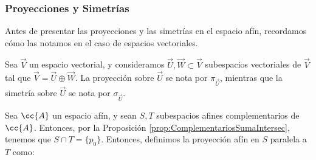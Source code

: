 \subsubsection{Proyecciones y Simetrías}
\begin{notacion}
    Antes de presentar las proyecciones y las simetrías en el espacio afín, recordamos cómo las notamos en el caso de espacios vectoriales.
    
    Sea $\vec{V}$ un espacio vectorial, y consideramos $\vec{U},\vec{W}\subset\vec{V}$ subespacios vectoriales de $\vec{V}$ tal que $\vec{V}=\vec{U}\oplus \vec{W}$. La proyección sobre $\vec{U}$ se nota por $\pi_{\vec{U}}$, mientras que la simetría sobre $\vec{U}$ se nota por $\sigma_{\vec{U}}$.
\end{notacion}
\begin{definicion}[Proyección]
    Sea $\cc{A}$ un espacio afín, y sean $S,T$ subespacios afines complementarios de $\cc{A}$. Entonces, por la Proposición \ref{prop:ComplementariosSumaIntersec}, tenemos que $S\cap T=\{p_0\}$. Entonces, definimos la proyección afín en $S$ paralela a $T$ como:
\end{definicion}
